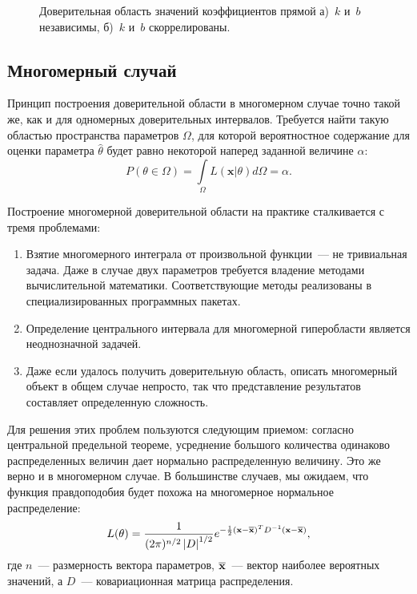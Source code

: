 \begin{figure}[h]
    \centering
    
    \caption{Доверительная область значений коэффициентов прямой а)~$k$ и~$b$ независимы,
б)~$k$ и~$b$ скоррелированы.}
    \label{fig:kb}
\end{figure}


\subsection{Многомерный случай}

Принцип построения доверительной области в многомерном случае точно
такой же, как и для одномерных доверительных интервалов. Требуется найти
такую областью пространства параметров $\Omega$, для которой
вероятностное содержание для оценки параметра $\hat \theta$
будет равно некоторой наперед заданной
величине $\alpha$:
\begin{equation}
    P(\theta \in \Omega) = \int\limits_\Omega{L(\mathbf{x} | \theta)}d\Omega = \alpha.
\end{equation}

Построение многомерной доверительной области на практике сталкивается с тремя
проблемами:
\begin{enumerate}
\item Взятие многомерного интеграла от произвольной функции~--- не тривиальная
  задача. Даже в случае двух параметров требуется владение
  методами вычислительной математики. Соответствующие методы реализованы
  в специализированных программных пакетах.
\item Определение центрального интервала для многомерной гиперобласти
является неоднозначной задачей.
\item Даже если удалось получить доверительную область, описать многомерный
объект в общем случае непросто, так что представление результатов
  составляет определенную сложность.
\end{enumerate}

Для решения этих проблем пользуются следующим приемом: согласно
центральной предельной теореме, усреднение большого количества одинаково
распределенных величин дает нормально распределенную величину. Это же
верно и в многомерном случае. В большинстве случаев, мы ожидаем, что
функция правдоподобия будет похожа на многомерное нормальное
распределение:
\begin{equation}
    L(\theta) = \frac{1}{(2 \pi)^{n/2}\left|D\right|^{1/2}} e^{-\frac{1}{2}
        (\mathbf{x} - \overline{\mathbf{x}})^T D^{-1} (\mathbf{x} - \overline{\mathbf{x}})},
\end{equation}
где $n$~--- размерность вектора параметров, $\overline{\mathbf{x}}$~--- вектор
наиболее вероятных значений, а $D$~--- ковариационная матрица распределения.

